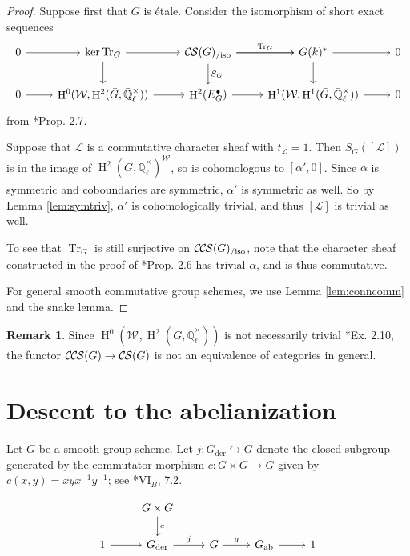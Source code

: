 \documentclass[10pt]{amsart}
\theoremstyle{plain}
\theoremstyle{definition}
\newtheorem{remark}[theorem]{Remark}
\newcommand{\EE}{\mathbb{\bar Q}_\ell}
\newcommand{\Fq}{k}
\newcommand{\EEx}{\EE^\times}
\newcommand{\Weil}[1]{\mathcal{W}_{#1}}
\DeclareMathOperator{\Hh}{H}
\newcommand{\der}{_{\operatorname{der}}}
\newcommand{\ab}{_{\operatorname{ab}}}
\newcommand{\trFrob}[1]{t_{#1}}
\newcommand{\TrFrob}[1]{\operatorname{Tr}_{#1}}
\newcommand{\cs}[1]{{\mathcal{#1}}}
\newcommand{\CS}{{\mathcal{C\hskip-0.8pt S}}}
\newcommand{\CCS}{{\mathcal{C\hskip-.8pt C\hskip-0.8pt S}}}
\newcommand{\CSiso}[1]{\CS(#1)_{/\text{iso}}}
\newcommand{\CCSiso}[1]{\CCS(#1)_{/\text{iso}}}
\newcommand{\bG}{\bar{G}}
\begin{document}
\begin{proof}
Suppose first that $G$ is \'etale.  Consider the isomorphism of short exact sequences
\[
\begin{tikzcd}
 0 \arrow{r} & \ker \TrFrob{G} \arrow{d} \arrow{r} & \CSiso{G}\arrow{d}{S_G} \arrow{r}{\TrFrob{G}} \arrow{r} & G(\Fq)^* \arrow{d} \arrow{r} & 0\\
  0 \arrow{r} & \Hh^0(\Weil{},\Hh^2(\bG,\EEx)) \arrow{r} & \Hh^2(E^\bullet_G) \arrow{r} & \Hh^1(\Weil{},\Hh^1(\bG,\EEx)) \arrow{r} & 0
 \end{tikzcd}
 \]
from \cite{cunningham-roe:13a}*{Prop. 2.7}.

Suppose that $\cs{L}$ is a commutative character sheaf
with $\trFrob{\cs{L}} = 1$.  Then $S_G([\cs{L}])$ is in the image of $\Hh^2(\bG, \EEx)^\Weil{}$, so is cohomologous to
$[\alpha', 0]$.  Since $\alpha$ is symmetric and coboundaries are symmetric, $\alpha'$ is symmetric as well.
So by Lemma \ref{lem:symtriv}, $\alpha'$ is cohomologically trivial, and thus $[\cs{L}]$ is trivial as well.

To see that $\TrFrob{G}$ is still surjective on $\CCSiso{G}$, note that the character sheaf constructed in the proof of
\cite{cunningham-roe:13a}*{Prop. 2.6} has trivial $\alpha$, and is thus commutative.

For general smooth commutative group schemes, we use Lemma \ref{lem:conncomm} and the snake lemma.
\end{proof}

\begin{remark}
Since $\Hh^0(\Weil{},\Hh^2(\bG,\EEx))$ is not necessarily trivial \cite{cunningham-roe:13a}*{Ex. 2.10}, the functor
$\CCS(G) \to \CS(G)$ is not an equivalence of categories in general.
\end{remark}

\section{Descent to the abelianization}
  
Let $G$ be a smooth group scheme.
Let $j: G\der \hookrightarrow G$ denote the closed subgroup generated by the commutator morphism $c: G\times G \to G$ given by $c(x,y) = xyx^{-1}y^{-1}$; see \cite{SGA3}*{{VI}$_B$, 7.2}.

\[
\begin{tikzcd}
{} & G\times G \arrow{d}{c} &&&\\
1 \arrow{r} & G\der \arrow{r}{j} & G \arrow{r}{q} & G\ab \arrow{r} & 1
\end{tikzcd}
\]
\end{document}
